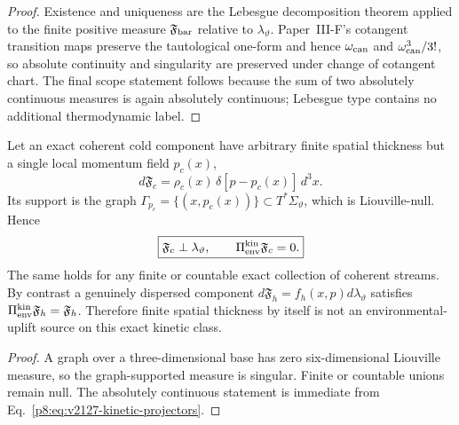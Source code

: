 \documentclass[12pt,a4paper]{article}
\begin{document}
\begin{proof}
Existence and uniqueness are the Lebesgue decomposition theorem applied to the
finite positive measure $\mathfrak F_{\rm bar}$ relative to
$\lambda_\vartheta$.  Paper~III-F's cotangent transition maps preserve the
tautological one-form and hence $\omega_{\rm can}$ and
$\omega_{\rm can}^3/3!$, so absolute continuity and singularity are preserved
under change of cotangent chart.  The final scope statement follows because
the sum of two absolutely continuous measures is again absolutely continuous;
Lebesgue type contains no additional thermodynamic label.
\end{proof}

\begin{corollary}
\label{p8:cor:v2127-finite-thickness-coherent-source}
Let an exact coherent cold component have arbitrary finite spatial thickness
but a single local momentum field $p_c(x)$,
\begin{equation}
 d\mathfrak F_c
 =\rho_c(x)\,\delta[p-p_c(x)]\,d^3x.
\label{p8:eq:v2127-coherent-graph-measure}
\end{equation}
Its support is the graph
$\Gamma_{p_c}=\{(x,p_c(x))\}\subset T^*\Sigma_\vartheta$, which is
Liouville-null.  Hence
\begin{equation}
 \boxed{
 \mathfrak F_c\perp\lambda_\vartheta,
 \qquad
 \Pi_{\rm env}^{\rm kin}\mathfrak F_c=0.}
\label{p8:eq:v2127-coherent-zero-env}
\end{equation}
The same holds for any finite or countable exact collection of coherent
streams.  By contrast a genuinely dispersed component
$d\mathfrak F_h=f_h(x,p)d\lambda_\vartheta$ satisfies
$\Pi_{\rm env}^{\rm kin}\mathfrak F_h=\mathfrak F_h$.
Therefore finite spatial thickness by itself is not an environmental-uplift
source on this exact kinetic class.
\end{corollary}

\begin{proof}
A graph over a three-dimensional base has zero six-dimensional Liouville
measure, so the graph-supported measure is singular.  Finite or countable
unions remain null.  The absolutely continuous statement is immediate from
Eq.~\eqref{p8:eq:v2127-kinetic-projectors}.
\end{proof}
\end{document}
